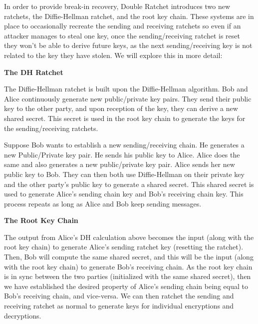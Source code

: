 In order to provide break-in recovery, Double Ratchet introduces two new ratchets, the Diffie-Hellman ratchet, 
and the root key chain. These systems are in place to occasionally recreate the sending and receiving ratchets 
so even if an attacker manages to steal one key, once the sending/receiving ratchet is reset they won't be able 
to derive future keys, as the next sending/receiving key is not related to the key they have stolen. We will explore this in more detail:

\textbf{The DH Ratchet}

The Diffie-Hellman ratchet is built upon the Diffie-Hellman algorithm. Bob and Alice continuously generate new 
public/private key pairs. They send their public key to the other party, and upon reception of the key, they can derive 
a new shared secret. This secret is used in the root key chain to generate the keys for the sending/receiving ratchets.

Suppose Bob wants to establish a new sending/receiving chain. He generates 
a new Public/Private key pair. He sends his public key to Alice. Alice does the same and also generates a new public/private 
key pair. Alice sends her new public key to Bob. They can then both use Diffie-Hellman on their private key and the other party's public key 
to generate a shared secret. This shared secret is used to generate Alice's sending chain key and Bob's receiving chain key. This process 
repeats as long as Alice and Bob keep sending messages.

\textbf{The Root Key Chain}

The output from Alice's DH calculation above becomes the input (along with the root key chain) to generate Alice's 
sending ratchet key (resetting the ratchet). Then, Bob will compute the same shared secret, and this will be the input (along with the root key chain)
to generate Bob's receiving chain. As the root key chain is in sync between the two parties (initialized with the same shared secret),
then we have established the desired property of Alice's sending chain being equal to Bob's receiving chain, and vice-versa.
We can then ratchet the sending and receiving ratchet as normal to generate keys for individual encryptions and decryptions.
